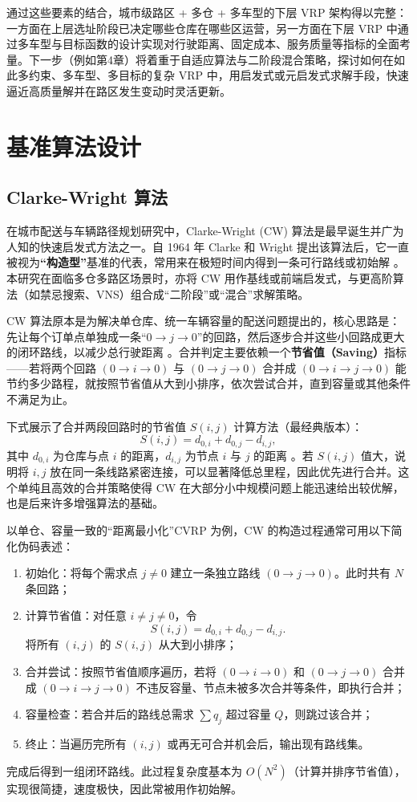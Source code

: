 \documentclass[12pt,a4paper,twoside]{ctexbook}
\begin{document}
通过这些要素的结合，城市级路区 + 多仓 + 多车型的下层 VRP 架构得以完整：一方面在上层选址阶段已决定哪些仓库在哪些区运营，另一方面在下层 VRP 中通过多车型与目标函数的设计实现对行驶距离、固定成本、服务质量等指标的全面考量。下一步（例如第4章）将着重于自适应算法与二阶段混合策略，探讨如何在如此多约束、多车型、多目标的复杂 VRP 中，用启发式或元启发式求解手段，快速逼近高质量解并在路区发生变动时灵活更新。

\section{基准算法设计}

\subsection{Clarke-Wright 算法}

在城市配送与车辆路径规划研究中，Clarke-Wright (CW) 算法是最早诞生并广为人知的快速启发式方法之一。自 1964 年 Clarke 和 Wright 提出该算法后，它一直被视为\textbf{“构造型”}基准的代表，常用来在极短时间内得到一条可行路线或初始解 \cite{clarke1964scheduling}。本研究在面临多仓多路区场景时，亦将 CW 用作基线或前端启发式，与更高阶算法（如禁忌搜索、VNS）组合成“二阶段”或“混合”求解策略。

CW 算法原本是为解决单仓库、统一车辆容量的配送问题提出的，核心思路是：先让每个订单点单独成一条“$0 \to j \to 0$”的回路，然后逐步合并这些小回路成更大的闭环路线，以减少总行驶距离 \cite{golden2008vehicle}。合并判定主要依赖一个\textbf{节省值（Saving）}指标——若将两个回路 $(0 \to i \to 0)$ 与 $(0 \to j \to 0)$ 合并成 $(0 \to i \to j \to 0)$ 能节约多少路程，就按照节省值从大到小排序，依次尝试合并，直到容量或其他条件不满足为止。

下式展示了合并两段回路时的节省值 $S(i,j)$ 计算方法（最经典版本）：
\[
S(i,j) = d_{0,i} + d_{0,j} - d_{i,j},
\]
其中 $d_{0,i}$ 为仓库与点 $i$ 的距离，$d_{i,j}$ 为节点 $i$ 与 $j$ 的距离 \cite{laporte2009fifty}。若 $S(i,j)$ 值大，说明将 $i,j$ 放在同一条线路紧密连接，可以显著降低总里程，因此优先进行合并。这个单纯且高效的合并策略使得 CW 在大部分小中规模问题上能迅速给出较优解，也是后来许多增强算法的基础。

以单仓、容量一致的“距离最小化”CVRP 为例，CW 的构造过程通常可用以下简化伪码表述：
\begin{enumerate}
    \item 初始化：将每个需求点 $j \neq 0$ 建立一条独立路线 $(0 \to j \to 0)$。此时共有 $N$ 条回路；
    \item 计算节省值：对任意 $i \neq j \neq 0$，令
    \[
    S(i,j) = d_{0,i} + d_{0,j} - d_{i,j}.
    \]
    将所有 $(i,j)$ 的 $S(i,j)$ 从大到小排序；
    \item 合并尝试：按照节省值顺序遍历，若将 $(0 \to i \to 0)$ 和 $(0 \to j \to 0)$ 合并成 $(0 \to i \to j \to 0)$ 不违反容量、节点未被多次合并等条件，即执行合并；
    \item 容量检查：若合并后的路线总需求 $\sum q_j$ 超过容量 $Q$，则跳过该合并；
    \item 终止：当遍历完所有 $(i,j)$ 或再无可合并机会后，输出现有路线集。
\end{enumerate}
完成后得到一组闭环路线。此过程复杂度基本为 $O(N^2)$（计算并排序节省值），实现很简捷，速度极快，因此常被用作初始解。
\end{document}
